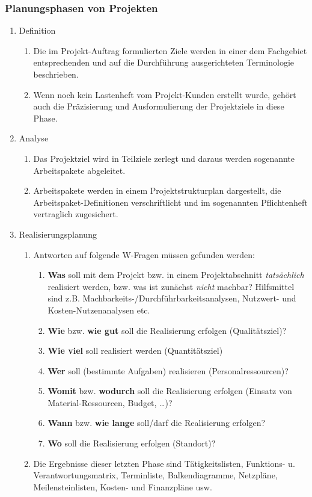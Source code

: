 \subsubsection{Planungsphasen von Projekten}
\begin{enumerate}
	\item Definition
	\begin{enumerate}
		\item Die im Projekt-Auftrag formulierten Ziele werden in einer dem Fachgebiet entsprechenden und auf die Durchführung ausgerichteten Terminologie beschrieben.
		\item Wenn noch kein Lastenheft vom Projekt-Kunden erstellt wurde, gehört auch die Präzisierung und Ausformulierung der Projektziele in diese Phase.
	\end{enumerate}
	\item Analyse
	\begin{enumerate}
		\item Das Projektziel wird in Teilziele zerlegt und daraus werden sogenannte Arbeitspakete abgeleitet.
		\item Arbeitspakete werden in einem Projektstrukturplan dargestellt, die Arbeitspaket-Definitionen verschriftlicht und im sogenannten Pflichtenheft vertraglich zugesichert.
	\end{enumerate}
	\item Realisierungsplanung
	\begin{enumerate}
		\item Antworten auf folgende W-Fragen müssen gefunden werden:
			\begin{enumerate}
				\item {\bf Was} soll mit dem Projekt bzw. in einem Projektabschnitt {\it tatsächlich} realisiert werden, bzw. was ist zunächst {\it nicht} machbar? Hilfsmittel sind z.B. Machbarkeits-/Durchführbarkeitsanalysen, Nutzwert- und Kosten-Nutzenanalysen etc.
				\item {\bf Wie} bzw. {\bf wie gut} soll die Realisierung erfolgen (Qualitätsziel)?
				\item {\bf Wie viel} soll realisiert werden (Quantitätsziel)
				\item {\bf Wer} soll (bestimmte Aufgaben) realisieren (Personalressourcen)?
				\item {\bf Womit} bzw. {\bf wodurch} soll die Realisierung erfolgen (Einsatz von Material-Ressourcen, Budget, \dots)?
				\item {\bf Wann} bzw. {\bf wie lange} soll/darf die Realisierung erfolgen?
				\item {\bf Wo} soll die Realisierung erfolgen (Standort)?
			\end{enumerate}				 
		\item Die Ergebnisse dieser letzten Phase sind Tätigkeitslisten, Funktions- u. Verantwortungsmatrix, Terminliste, Balkendiagramme, Netzpläne, Meilensteinlisten, Kosten- und Finanzpläne usw.
	\end{enumerate}	
\end{enumerate}

